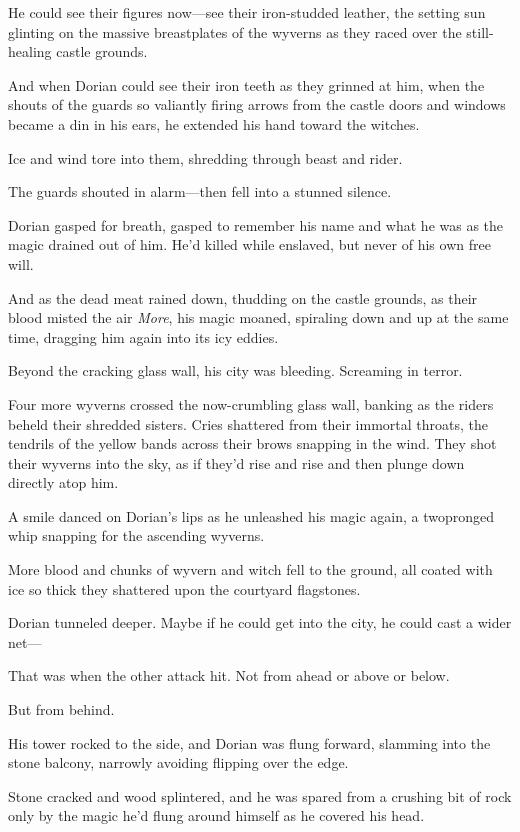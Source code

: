 He could see their figures now---see their iron-studded leather, the setting sun glinting on the massive breastplates of the wyverns as they raced over the still-healing castle grounds.

And when Dorian could see their iron teeth as they grinned at him, when the shouts of the guards so valiantly firing arrows from the castle doors and windows became a din in his ears, he extended his hand toward the witches.

Ice and wind tore into them, shredding through beast and rider.

The guards shouted in alarm---then fell into a stunned silence.

Dorian gasped for breath, gasped to remember his name and what he was as the magic drained out of him. He'd killed while enslaved, but never of his own free will.

And as the dead meat rained down, thudding on the castle grounds, as their blood misted the air  \emph{More}, his magic moaned, spiraling down and up at the same time, dragging him again into its icy eddies.

Beyond the cracking glass wall, his city was bleeding. Screaming in terror.

Four more wyverns crossed the now-crumbling glass wall, banking as the riders beheld their shredded sisters. Cries shattered from their immortal throats, the tendrils of the yellow bands across their brows snapping in the wind. They shot their wyverns into the sky, as if they'd rise and rise and then plunge down directly atop him.

A smile danced on Dorian's lips as he unleashed his magic again, a twopronged whip snapping for the ascending wyverns.

More blood and chunks of wyvern and witch fell to the ground, all coated with ice so thick they shattered upon the courtyard flagstones.

Dorian tunneled deeper. Maybe if he could get into the city, he could cast a wider net---

That was when the other attack hit. Not from ahead or above or below.

But from behind.

His tower rocked to the side, and Dorian was flung forward, slamming into the stone balcony, narrowly avoiding flipping over the edge.

Stone cracked and wood splintered, and he was spared from a crushing bit of rock only by the magic he'd flung around himself as he covered his head.

